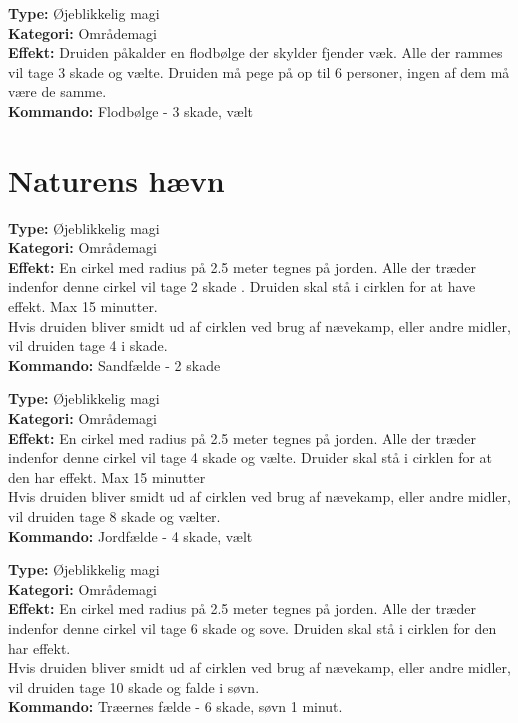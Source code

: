 \begin{nkaos*}[Flodbølge]
\textbf{Type:} Øjeblikkelig magi\\
\textbf{Kategori:} Områdemagi\\
\textbf{Effekt:} Druiden påkalder en flodbølge der skylder fjender væk. Alle der rammes vil tage 3 skade og vælte. Druiden må pege på op til 6 personer, ingen af dem må være de samme.\\
\textbf{Kommando:} Flodbølge - 3 skade, vælt
\end{nkaos*}

\section{Naturens hævn}

\begin{nhævn*}[Sandfælde]
\textbf{Type:} Øjeblikkelig magi\\ 
\textbf{Kategori:} Områdemagi\\
\textbf{Effekt:} En cirkel med radius på 2.5 meter tegnes på jorden. Alle der træder indenfor denne cirkel vil tage 2
skade . Druiden skal stå i cirklen for at have effekt. Max 15 minutter. \\ 
Hvis druiden bliver smidt ud af cirklen ved brug af nævekamp, eller andre midler, vil druiden tage 4 i skade.\\
\textbf{Kommando:} Sandfælde - 2 skade
\end{nhævn*}


\begin{nhævn*}[Jordfælde]
\textbf{Type:} Øjeblikkelig magi\\ 
\textbf{Kategori:} Områdemagi\\
\textbf{Effekt:} En cirkel med radius på 2.5 meter tegnes på jorden. Alle der træder indenfor denne cirkel vil tage 4 skade og vælte. Druider skal stå i cirklen for at den har effekt. Max 15 minutter\\
Hvis druiden bliver smidt ud af cirklen ved brug af nævekamp, eller andre midler, vil druiden tage 8 skade og vælter.\\
\textbf{Kommando:} Jordfælde - 4 skade, vælt
\end{nhævn*}

\begin{nhævn*}
\textbf{Type:} Øjeblikkelig magi\\
\textbf{Kategori:} Områdemagi\\
\textbf{Effekt:} En cirkel med radius på 2.5 meter tegnes på jorden. Alle der træder indenfor denne cirkel vil tage 6 skade og sove. Druiden skal stå i cirklen for den har effekt.\\
Hvis druiden bliver smidt ud af cirklen ved brug af nævekamp, eller andre midler, vil druiden tage 10 skade og falde i søvn.\\
\textbf{Kommando:} Træernes fælde - 6 skade, søvn 1 minut.
\end{nhævn*}

